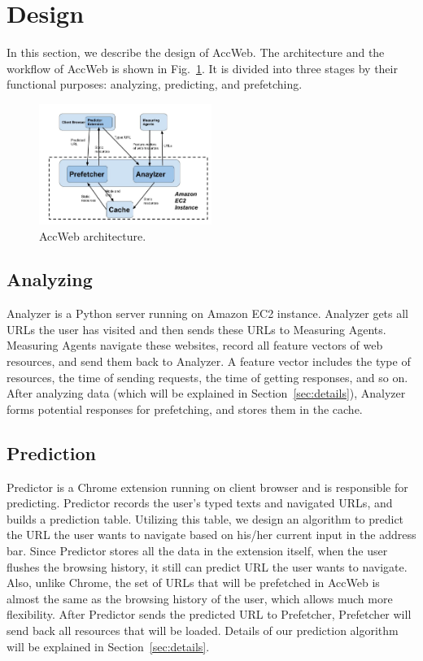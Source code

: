 \section{Design}
\label{sec:design}

In this section, we describe the design of AccWeb. The architecture and the workflow of AccWeb is shown in Fig.~\ref{fig:arch}. It is divided into three stages by their functional purposes: analyzing, predicting, and prefetching.

\begin{figure}[htbp] 
	\centering
	\includegraphics[width=0.5\textwidth]{ACCWeb-Arch-3.jpg}  
	\caption{AccWeb architecture.}
	\label{fig:arch}
\end{figure} 

\subsection{Analyzing}

Analyzer is a Python server running on Amazon EC2 instance. Analyzer gets all URLs the user has visited and then sends these URLs to Measuring Agents. Measuring Agents navigate these websites, record all feature vectors of web resources, and send them back to Analyzer. A feature vector includes the type of resources, the time of sending requests, the time of getting responses, and so on. After analyzing data (which will be explained in Section~\ref{sec:details}), Analyzer forms potential responses for prefetching, and stores them in the cache.

\subsection{Prediction}

Predictor is a Chrome extension running on client browser and is responsible for predicting. Predictor records the user's typed texts and navigated URLs, and builds a prediction table. Utilizing this table, we design an algorithm to predict the URL the user wants to navigate based on his/her current input in the address bar. Since Predictor stores all the data in the extension itself, when the user flushes the browsing history, it still can predict URL the user wants to navigate. Also, unlike Chrome, the set of URLs that will be prefetched in AccWeb is almost the same as the browsing history of the user, which allows much more flexibility. After Predictor sends the predicted URL to Prefetcher, Prefetcher will send back all resources that will be loaded. Details of our prediction algorithm will be explained in Section~\ref{sec:details}.

